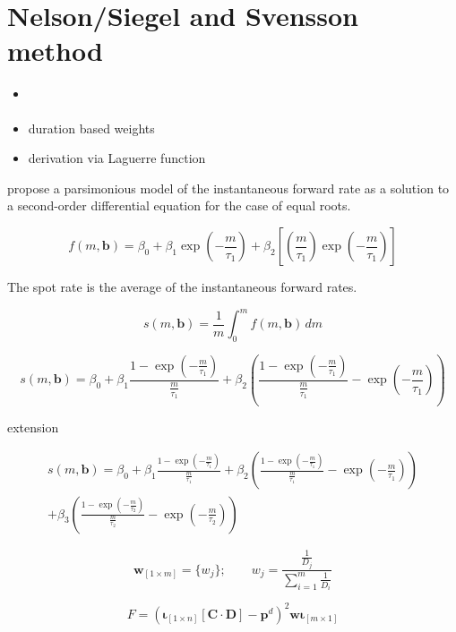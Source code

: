 
\section{Nelson/Siegel and Svensson method}
\label{sec:nels-svenss-meth}


\begin{itemize}
\item \cite{Geyer1999}
\item duration based weights \cite{Bliss1997}
\item derivation via Laguerre function
\end{itemize}

\cite{Nelson1987} propose a parsimonious  model of  the instantaneous forward rate as a solution to a second-order differential equation for the case of equal roots.

\begin{equation}
  \label{eq:laguerre}
  f(m,\bm{b}) = \beta_0+\beta_1\exp\left(-\frac{m}{\tau_1}\right)+\beta_2\left[\left(\frac{m}{\tau_1}\right)\exp\left(-\frac{m}{\tau_1}\right)\right]
\end{equation}


The spot rate is the average of the instantaneous forward rates. 

\begin{equation}
  \label{eq:intspotrate}
  s(m,\bm{b})=\frac{1}{m}\int_0^mf(m,\bm{b})\,dm
\end{equation}


\begin{equation}
  \label{eq:nelson-spot}
   s(m,\bm{b}) = \beta_0 + \beta_1\frac{1-\exp(-\frac{m}{\tau_1})}{\frac{m}{\tau_1}} + \beta_2\left(\frac{1-\exp(-\frac{m}{\tau_1})}{\frac{m}{\tau_1}} - \exp(-\frac{m}{\tau_1})\right)
\end{equation}


 
\cite{Svensson1994} extension


\begin{multline}\label{eq:svensson-spot}
    s(m,\bm{b}) = \beta_0 + \beta_1\frac{1-\exp(-\frac{m}{\tau_1})}{\frac{m}{\tau_1}} + \beta_2\left(\frac{1-\exp(-\frac{m}{\tau_1})}{\frac{m}{\tau_1}} - \exp(-\frac{m}{\tau_1})\right) \\+ \beta_3\left(\frac{1-\exp(-\frac{m}{\tau_2})}{\frac{m}{\tau_2}} - \exp(-\frac{m}{\tau_2})\right)
\end{multline}






\begin{equation}\label{eq:weights}
  \bm{w}_{\left[1\times m\right]}= \{w_j\}; \qquad   w_j=\frac{\frac{1}{D_j}}{\sum_{i=1}^m\frac{1}{D_i}}
\end{equation}


\begin{equation}\label{eq:objfct-nelson}
	F=\left( \bm{\iota}_{\left[1 \times n\right]}\left[\bm{C}\cdot\bm{D}\right] - 		\bm{p}^d\right)^2 \bm{w}\bm{\iota}_{\left[m \times 1\right]}
\end{equation}





